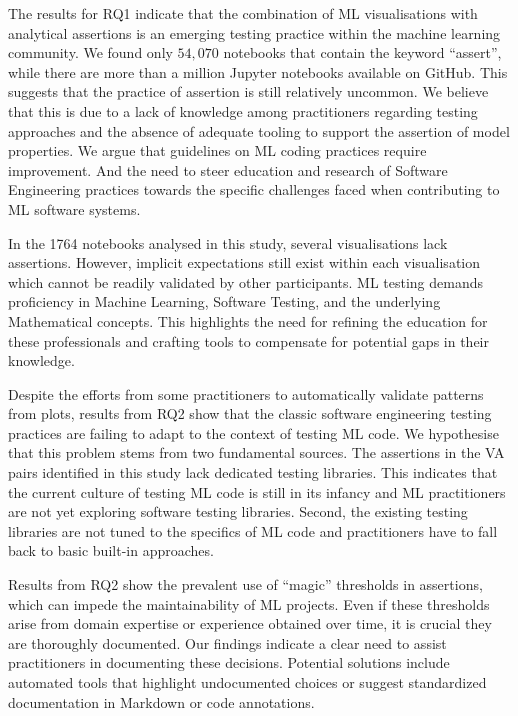 \documentclass[conference]{IEEEtran}
\begin{document}
The results for RQ1 indicate that the combination of ML visualisations with analytical assertions is an emerging testing practice within the machine learning community. We found only $54,070$ notebooks that contain the keyword ``assert'', while there are more than a million Jupyter notebooks available on GitHub. This suggests that the practice of assertion is still relatively uncommon. We believe that this is due to a lack of knowledge among practitioners regarding testing approaches and the absence of adequate tooling to support the assertion of model properties. We argue that guidelines on ML coding practices require improvement. And the need to steer education and research of Software Engineering practices towards the specific challenges faced  when contributing to ML software systems.

In the 1764 notebooks analysed in this study, several visualisations lack assertions. However, implicit expectations still exist within each visualisation which cannot be readily validated by other participants. ML testing demands proficiency in Machine Learning, Software Testing, and the underlying Mathematical concepts. This highlights the need for refining the education for these professionals and crafting tools to compensate for potential gaps in their knowledge.

Despite the efforts from some practitioners to automatically validate patterns from plots, results from RQ2 show that the classic software engineering testing practices are failing to adapt to the context of testing ML code. We hypothesise that this problem stems from two fundamental sources. The assertions in the VA pairs identified in this study lack dedicated testing libraries. This indicates that the current culture of testing ML code is still in its infancy and ML practitioners are not yet exploring software testing libraries. Second, the existing testing libraries are not tuned to the specifics of ML code and practitioners have to fall back to basic built-in approaches.

Results from RQ2 show the prevalent use of ``magic'' thresholds in assertions, which can impede the maintainability of ML projects. Even if these thresholds arise from domain expertise or experience obtained over time, it is crucial they are thoroughly documented. Our findings indicate a clear need to assist practitioners in documenting these decisions. Potential solutions include automated tools that highlight undocumented choices or suggest standardized documentation in Markdown or code annotations.
\end{document}

